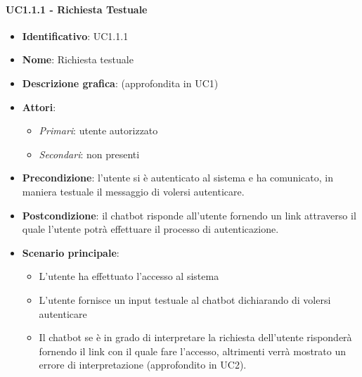 \paragraph{UC1.1.1 - Richiesta Testuale}
\begin{itemize}
   \item \textbf{Identificativo}: UC1.1.1
   \item \textbf{Nome}: Richiesta testuale
   \item \textbf{Descrizione grafica}: (approfondita in UC1)
   \item \textbf{Attori}:
   \begin{itemize} 
       \item \textit{Primari}: utente autorizzato
       \item \textit{Secondari}: non presenti
   \end{itemize}
       \item \textbf{Precondizione}: l'utente si è autenticato al sistema e ha comunicato, in maniera testuale il messaggio di volersi autenticare. 
       \item \textbf{Postcondizione}: il chatbot risponde all'utente fornendo un link attraverso il quale l'utente potrà effettuare il processo di autenticazione.  
    \item \textbf{Scenario principale}: 
       \begin{itemize}
           \item L'utente ha effettuato l'accesso al sistema 
           \item L'utente fornisce un input testuale al chatbot dichiarando di volersi autenticare 
           \item Il chatbot se è in grado di interpretare la richiesta dell'utente risponderà fornendo il link con il quale fare l'accesso, altrimenti verrà mostrato un errore di interpretazione (approfondito in UC2).
       \end{itemize}
\end{itemize}

